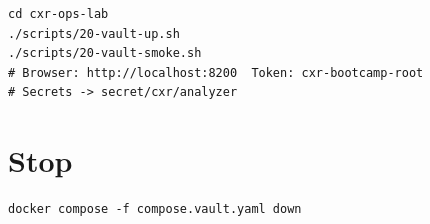 \documentclass[11pt,a4paper]{report}
\begin{document}
\begin{lstlisting}[style=bash]
cd cxr-ops-lab
./scripts/20-vault-up.sh
./scripts/20-vault-smoke.sh
# Browser: http://localhost:8200  Token: cxr-bootcamp-root
# Secrets -> secret/cxr/analyzer
\end{lstlisting}

\chapter{Stop}

\begin{lstlisting}[style=bash]
docker compose -f compose.vault.yaml down
\end{lstlisting}
\end{document}
